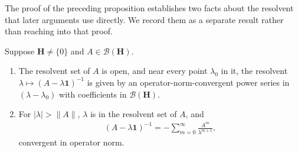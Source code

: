 The proof of the preceding proposition establishes two facts about the resolvent that later arguments use directly. We record them as a separate result rather than reaching into that proof.

\begin{proposition}
    \label{prpstn:resolvent-holomorphy-and-neumann-series}
    \leanok
    Suppose $\mathbf{H} \ne \{0\}$ and $A \in \mathcal{B}(\mathbf{H})$.
    \begin{enumerate}
        \item The resolvent set of $A$ is open, and near every point $\lambda_0$ in it, the resolvent $\lambda \mapsto (A-\lambda\mathbf{1})^{-1}$ is given by an operator-norm-convergent power series in $(\lambda - \lambda_0)$ with coefficients in $\mathcal{B}(\mathbf{H})$.
        \item For $\lvert \lambda \rvert > \|A\|$, $\lambda$ is in the resolvent set of $A$, and
        \begin{align}
            (A - \lambda\mathbf{1})^{-1} = -\sum_{m=0}^\infty \frac{A^m}{\lambda^{m+1}},
        \end{align}
        convergent in operator norm.
    \end{enumerate}
\end{proposition}
